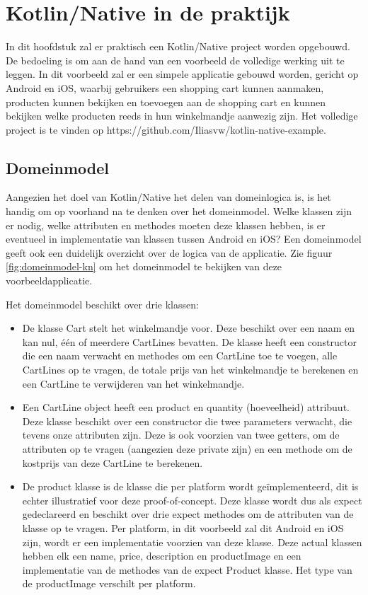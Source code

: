 \chapter{Kotlin/Native in de praktijk}
\label{ch:praktisch}
In dit hoofdstuk zal er praktisch een Kotlin/Native project worden opgebouwd. De bedoeling is om aan de hand van een voorbeeld de volledige werking uit te leggen. In dit voorbeeld zal er een simpele applicatie gebouwd worden, gericht op Android en iOS, waarbij gebruikers een shopping cart kunnen aanmaken, producten kunnen bekijken en toevoegen aan de shopping cart en kunnen bekijken welke producten reeds in hun winkelmandje aanwezig zijn. Het volledige project is te vinden op https://github.com/Iliasvw/kotlin-native-example.

\section{Domeinmodel}
\label{sec:domeinmodel}
Aangezien het doel van Kotlin/Native het delen van domeinlogica is, is het handig om op voorhand na te denken over het domeinmodel. Welke klassen zijn er nodig, welke attributen en methodes moeten deze klassen hebben, is er eventueel in implementatie van klassen tussen Android en iOS? Een domeinmodel geeft ook een duidelijk overzicht over de logica van de applicatie. Zie figuur \ref{fig:domeinmodel-kn} om het domeinmodel te bekijken van deze voorbeeldapplicatie. 

Het domeinmodel beschikt over drie klassen: 
\begin{itemize}
	\item De klasse Cart stelt het winkelmandje voor. Deze beschikt over een naam en kan nul, één of meerdere CartLines bevatten. De klasse heeft een constructor die een naam verwacht en methodes om een CartLine toe te voegen, alle CartLines op te vragen, de totale prijs van het winkelmandje te berekenen en een CartLine te verwijderen van het winkelmandje.
	
	\item Een CartLine object heeft een product en quantity (hoeveelheid) attribuut. Deze klasse beschikt over een constructor die twee parameters verwacht, die tevens onze attributen zijn. Deze is ook voorzien van twee getters, om de attributen op te vragen (aangezien deze private zijn) en een methode om de kostprijs van deze CartLine te berekenen.
	
	\item De product klasse is de klasse die per platform wordt geïmplementeerd, dit is echter illustratief voor deze proof-of-concept. Deze klasse wordt dus als expect gedeclareerd en beschikt over drie expect methodes om de attributen van de klasse op te vragen. Per platform, in dit voorbeeld zal dit Android en iOS zijn, wordt er een implementatie voorzien van deze klasse. Deze actual klassen hebben elk een name, price, description en productImage en een implementatie van de methodes van de expect Product klasse. Het type van de productImage verschilt per platform.
\end{itemize}


